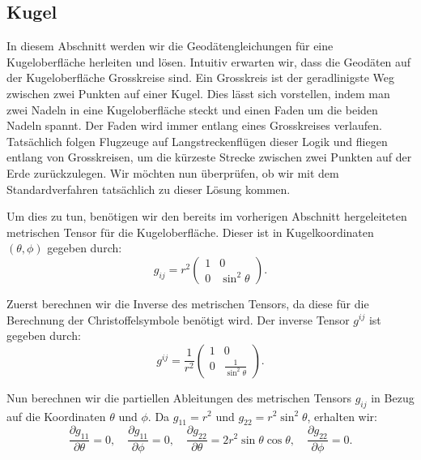 %
%
%
%
\subsection{Kugel\label{geodaeten:section:Standardverfahren:Kugel}}

In diesem Abschnitt werden wir die Geodätengleichungen für eine Kugeloberfläche herleiten und lösen.
Intuitiv erwarten wir, dass die Geodäten auf der Kugeloberfläche Grosskreise sind.
Ein Grosskreis ist der geradlinigste Weg zwischen zwei Punkten auf einer Kugel.
Dies lässt sich vorstellen, indem man zwei Nadeln in eine Kugeloberfläche steckt und einen Faden um die beiden Nadeln spannt.
Der Faden wird immer entlang eines Grosskreises verlaufen.
Tatsächlich folgen Flugzeuge auf Langstreckenflügen dieser Logik und fliegen entlang von Grosskreisen, um die kürzeste Strecke zwischen zwei Punkten auf der Erde zurückzulegen.
Wir möchten nun überprüfen, ob wir mit dem Standardverfahren tatsächlich zu dieser Lösung kommen.

Um dies zu tun, benötigen wir den bereits im vorherigen Abschnitt hergeleiteten metrischen Tensor für die Kugeloberfläche.
Dieser ist in Kugelkoordinaten $(\theta, \phi)$ gegeben durch:
\begin{equation}
	g_{ij} = r^2 \begin{pmatrix}
		1 & 0 \\
		0 & \sin^2\theta
	\end{pmatrix}.
\end{equation}

Zuerst berechnen wir die Inverse des metrischen Tensors, da diese für die Berechnung der Christoffelsymbole benötigt wird.
Der inverse Tensor $g^{ij}$ ist gegeben durch:
\begin{equation}
	g^{ij} = \frac{1}{r^2} 
	\begin{pmatrix}
		1 & 0 \\
		0 & \frac{1}{\sin^2\theta}
	\end{pmatrix}.
\end{equation}

Nun berechnen wir die partiellen Ableitungen des metrischen Tensors $g_{ij}$ in Bezug auf die Koordinaten $\theta$ und $\phi$.
Da $g_{11} = r^2$ und $g_{22} = r^2 \sin^2\theta$, erhalten wir:
\begin{equation}
	\frac{\partial g_{11}}{\partial \theta} = 0, \quad \frac{\partial g_{11}}{\partial \phi} = 0, \quad \frac{\partial g_{22}}{\partial \theta} = 2r^2 \sin\theta \cos\theta, \quad \frac{\partial g_{22}}{\partial \phi} = 0.
\end{equation}


